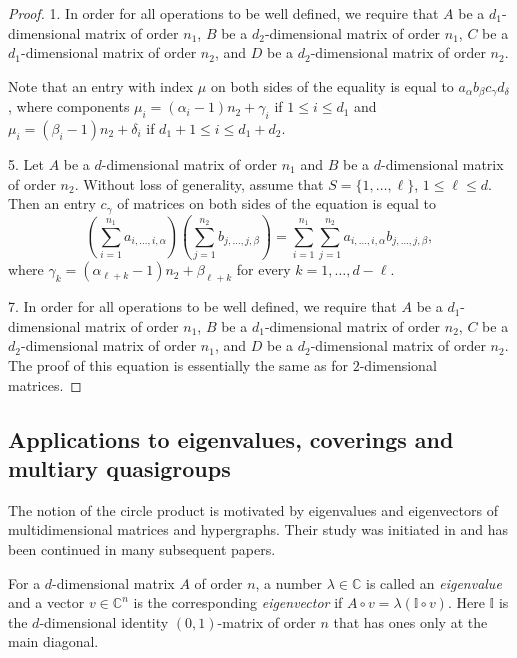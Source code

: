 \documentclass[a4paper]{article}
\begin{document}
\begin{proof}
1. In order for all operations to be well defined, we require that $A$ be a $d_1$-dimensional matrix of order $n_1$, $B$ be a $d_2$-dimensional matrix of order $n_1$, $C$ be a $d_1$-dimensional matrix of order $n_2$, and $D$ be a $d_2$-dimensional matrix of order $n_2$. 
 
Note that  an entry with index $\mu$ on both sides of the equality is equal to $a_{\alpha} b_\beta c_\gamma d_\delta$, where components  $\mu_i =(\alpha_i -1)n_2 + \gamma_i $ if $1 \leq i \leq d_1$ and  $\mu_i =(\beta_i -1)n_2 + \delta_i $  if $d_1 +1 \leq i \leq d_1 +d_2$.

5. Let $A$ be a $d$-dimensional matrix of order $n_1$ and $B$ be a $d$-dimensional matrix of order $n_2$. Without loss of generality, assume that $S = \{1, \ldots, \ell \}$, $1 \leq \ell \leq d$. Then an entry $c_{\gamma}$ of matrices on both sides of the equation is equal to 
$$\left(\sum\limits_{i=1}^{n_1}  a_{i, \ldots, i, \alpha}\right) \left(\sum\limits_{j=1}^{n_2}   b_{j, \ldots, j, \beta}\right)  = \sum\limits_{i=1}^{n_1} \sum\limits_{j=1}^{n_2}  a_{i, \ldots, i, \alpha}  b_{j, \ldots, j, \beta},$$
 where $\gamma_k = (\alpha_{\ell + k} - 1)n_2 + \beta_{\ell + k}$ for every $k = 1, \ldots, d- \ell$. 

7. In order for all operations to be well defined, we require that $A$ be a $d_1$-dimensional matrix of order $n_1$, $B$ be a $d_1$-dimensional matrix of order $n_2$, $C$ be a $d_2$-dimensional matrix of order $n_1$, and $D$ be a $d_2$-dimensional matrix of order $n_2$. The proof of this equation is essentially the same as for $2$-dimensional matrices. 
\end{proof}



\subsection{Applications to eigenvalues, coverings and multiary quasigroups} \label{applsec}

The notion of the circle product is motivated by  eigenvalues and eigenvectors of multidimensional matrices and hypergraphs. Their study was initiated in \cite{lim.eigentensor, qi.eigentensor} and has been continued in many subsequent papers.

For a $d$-dimensional matrix $A$ of order $n$,  a number $\lambda\in \mathbb{C}$ is called an \textit{eigenvalue} and a vector $v \in \mathbb{C}^n$ is the corresponding \textit{eigenvector} if $A \circ v = \lambda (\mathbb{I} \circ v)$. Here $\mathbb{I}$ is the $d$-dimensional identity $(0,1)$-matrix of order $n$ that  has ones only at the main diagonal.  
\end{document}
